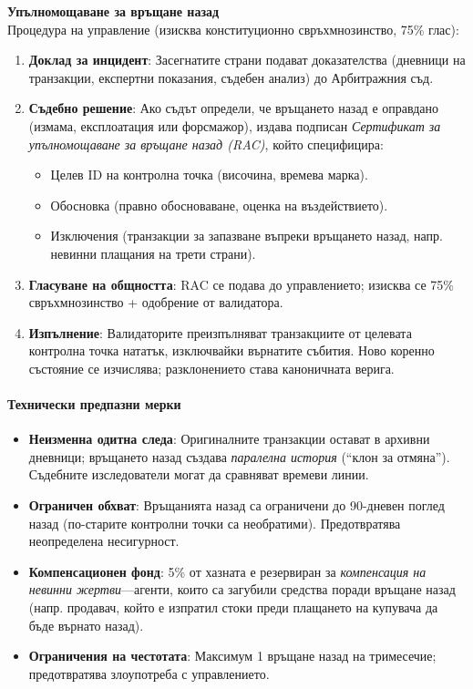 \documentclass[11pt]{article}
\begin{document}
\textbf{Упълномощаване за връщане назад}\\
Процедура на управление (изисква конституционно свръхмнозинство, 75\% глас):
\begin{enumerate}[noitemsep]
  \item \textbf{Доклад за инцидент}: Засегнатите страни подават доказателства (дневници на транзакции, експертни показания, съдебен анализ) до Арбитражния съд.
  \item \textbf{Съдебно решение}: Ако съдът определи, че връщането назад е оправдано (измама, експлоатация или форсмажор), издава подписан \emph{Сертификат за упълномощаване за връщане назад (RAC)}, който специфицира:
    \begin{itemize}[noitemsep]
      \item Целев ID на контролна точка (височина, времева марка).
      \item Обосновка (правно обосноваване, оценка на въздействието).
      \item Изключения (транзакции за запазване въпреки връщането назад, напр. невинни плащания на трети страни).
    \end{itemize}
  \item \textbf{Гласуване на общността}: RAC се подава до управлението; изисква се 75\% свръхмнозинство + одобрение от валидатора.
  \item \textbf{Изпълнение}: Валидаторите преизпълняват транзакциите от целевата контролна точка нататък, изключвайки върнатите събития. Ново коренно състояние се изчислява; разклонението става каноничната верига.
\end{enumerate}

\paragraph{Технически предпазни мерки}
\begin{itemize}[noitemsep]
  \item \textbf{Неизменна одитна следа}: Оригиналните транзакции остават в архивни дневници; връщането назад създава \emph{паралелна история} (``клон за отмяна''). Съдебните изследователи могат да сравняват времеви линии.
  \item \textbf{Ограничен обхват}: Връщанията назад са ограничени до 90-дневен поглед назад (по-старите контролни точки са необратими). Предотвратява неопределена несигурност.
  \item \textbf{Компенсационен фонд}: 5\% от хазната е резервиран за \emph{компенсация на невинни жертви}—агенти, които са загубили средства поради връщане назад (напр. продавач, който е изпратил стоки преди плащането на купувача да бъде върнато назад).
  \item \textbf{Ограничения на честотата}: Максимум 1 връщане назад на тримесечие; предотвратява злоупотреба с управлението.
\end{itemize}
\end{document}
